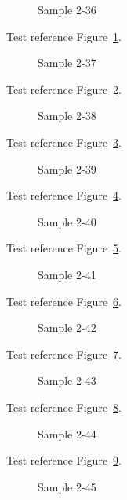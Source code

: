 \begin{figure}[tbhp]
\caption{Sample 2-36}
\label{fig:sample-2-36}
\end{figure}

Test reference Figure~\ref{fig:sample-2-36}.

\begin{figure}[tbhp]
\caption{Sample 2-37}
\label{fig:sample-2-37}
\end{figure}

Test reference Figure~\ref{fig:sample-2-37}.

\begin{figure}[tbhp]
\caption{Sample 2-38}
\label{fig:sample-2-38}
\end{figure}

Test reference Figure~\ref{fig:sample-2-38}.

\begin{figure}[tbhp]
\caption{Sample 2-39}
\label{fig:sample-2-39}
\end{figure}

Test reference Figure~\ref{fig:sample-2-39}.

\begin{figure}[tbhp]
\caption{Sample 2-40}
\label{fig:sample-2-40}
\end{figure}

Test reference Figure~\ref{fig:sample-2-40}.

\begin{figure}[tbhp]
\caption{Sample 2-41}
\label{fig:sample-2-41}
\end{figure}

Test reference Figure~\ref{fig:sample-2-41}.

\begin{figure}[tbhp]
\caption{Sample 2-42}
\label{fig:sample-2-42}
\end{figure}

Test reference Figure~\ref{fig:sample-2-42}.

\begin{figure}[tbhp]
\caption{Sample 2-43}
\label{fig:sample-2-43}
\end{figure}

Test reference Figure~\ref{fig:sample-2-43}.

\begin{figure}[tbhp]
\caption{Sample 2-44}
\label{fig:sample-2-44}
\end{figure}

Test reference Figure~\ref{fig:sample-2-44}.

\begin{figure}[tbhp]
\caption{Sample 2-45}
\label{fig:sample-2-45}
\end{figure}

